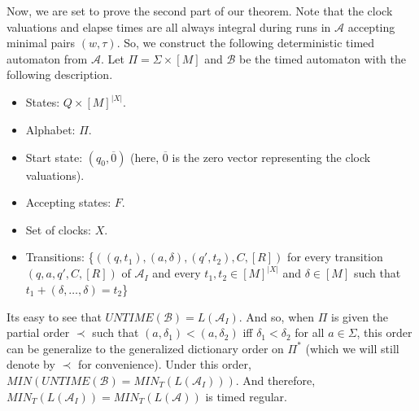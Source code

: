 \documentclass[a4paper,12pt]{article}
\theoremstyle{break}
\begin{document}
Now, we are set to prove the second part of our theorem. Note that the clock valuations and elapse times are all always integral during runs in $\mathcal{A}$ accepting minimal pairs $(w,\tau)$. So, we construct the following deterministic timed automaton from $\mathcal{A}$. Let $\Pi=\Sigma\times [M]$ and $\mathcal{B}$ be the timed automaton with the following description.
\begin{itemize}
    \item States: $Q\times [M]^{|X|}$.
    \item Alphabet: $\Pi$.
    \item Start state: $(q_0,\overline{0})$ (here, $\overline{0}$ is the zero vector representing the clock valuations).
    \item Accepting states: $F$.
    \item Set of clocks: $X$.
    \item Transitions: \{$((q,t_1),(a,\delta),(q',t_2), C, [R])$ for every transition $(q,a,q',C,[R])$ of $\mathcal{A}_I$ and every $t_1,t_2\in[M]^{|X|}$ and $\delta\in [M]$ such that $t_1+(\delta,\dots,\delta)=t_2$\}
\end{itemize}

Its easy to see that $UNTIME(\mathcal{B})=L(\mathcal{A}_I)$. And so, when $\Pi$ is given the partial order $\prec$ such that $(a,\delta_1)<(a,\delta_2)$ iff $\delta_1<\delta_2$ for all $a\in\Sigma$, this order can be generalize to the generalized dictionary order on $\Pi^*$ (which we will still denote by $\prec$ for convenience). Under this order, $MIN(UNTIME(\mathcal{B})=MIN_T(L(\mathcal{A}_I)))$. And therefore, $MIN_T(L(\mathcal{A}_I))=MIN_T(L(\mathcal{A}))$ is timed regular.
\end{document}
